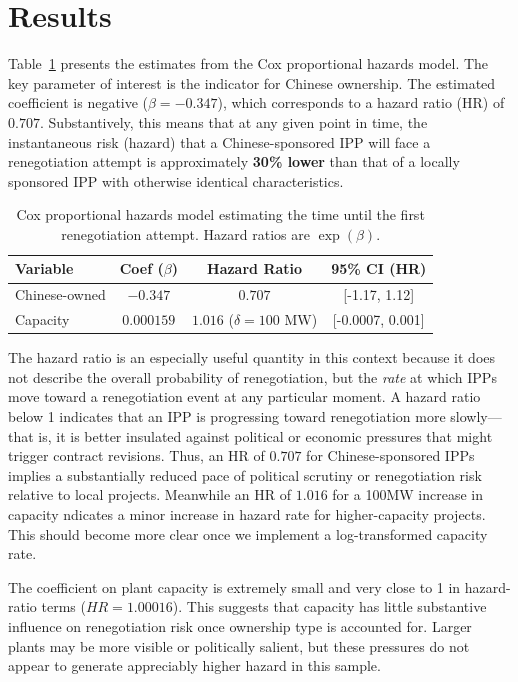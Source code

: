 \documentclass[12pt]{article}
\begin{document}
\section{Results}

Table~\ref{tab:coxresults} presents the estimates from the Cox proportional hazards
model. The key parameter of interest is the indicator for Chinese ownership.
The estimated coefficient is negative ($\beta = -0.347$), which corresponds to a
hazard ratio (HR) of $0.707$. Substantively, this means that at any given point
in time, the instantaneous risk (hazard) that a Chinese-sponsored IPP will face
a renegotiation attempt is approximately \textbf{30\% lower} than that of a
locally sponsored IPP with otherwise identical characteristics.

\begin{table}[h!]
\centering
\begin{tabular}{lccc}
\hline
\textbf{Variable} & \textbf{Coef ($\beta$)} & \textbf{Hazard Ratio} & \textbf{95\% CI (HR)} \\
\hline
Chinese-owned     & $-0.347$  & $0.707$ & [-1.17, 1.12] \\
Capacity    & $0.000159$ & $1.016$ ($\delta = 100$ MW)  & [-0.0007, 0.001] \\
\hline
\end{tabular}
\caption{Cox proportional hazards model estimating the time until the first 
renegotiation attempt. Hazard ratios are $\exp(\beta)$.}
\label{tab:coxresults}
\end{table}

The hazard ratio is an especially useful quantity in this context because it does not describe the overall probability of renegotiation, but the \emph{rate} at which IPPs move toward a renegotiation event at any particular moment. A hazard ratio below 1 indicates that an IPP is progressing toward renegotiation more slowly---that is, it is better insulated against political or economic pressures that might trigger contract revisions.
Thus, an HR of $0.707$ for Chinese-sponsored IPPs implies a substantially reduced pace of political scrutiny or renegotiation risk relative to local projects. Meanwhile an HR of $1.016$ for a 100MW increase in capacity ndicates a minor increase in hazard rate for higher-capacity projects. This should become more clear once we implement a log-transformed capacity rate.

The coefficient on plant capacity is extremely small and very close to 1 in hazard-ratio terms ($HR=1.00016$). This suggests that capacity has little substantive influence on renegotiation risk once ownership type is accounted for. Larger plants may be more visible or politically salient, but these pressures do not appear to generate appreciably higher hazard in this sample.
\end{document}
